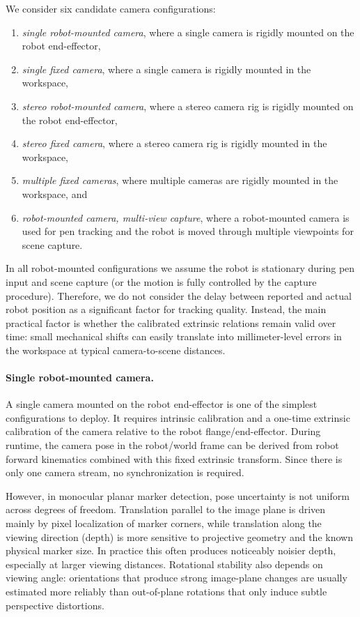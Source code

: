 We consider six candidate camera configurations:
\begin{enumerate}[label=(\roman*), itemsep=0.2em]
    \item \emph{single robot-mounted camera}, where a single camera is rigidly mounted on the robot end-effector,
    \item \emph{single fixed camera}, where a single camera is rigidly mounted in the workspace,
    \item \emph{stereo robot-mounted camera}, where a stereo camera rig is rigidly mounted on the robot end-effector,
    \item \emph{stereo fixed camera}, where a stereo camera rig is rigidly mounted in the workspace,
    \item \emph{multiple fixed cameras}, where multiple cameras are rigidly mounted in the workspace, and
    \item \emph{robot-mounted camera, multi-view capture}, where a robot-mounted camera is used for pen tracking and the robot is moved through multiple viewpoints for scene capture.
\end{enumerate}

In all robot-mounted configurations we assume the robot is stationary during pen input and scene capture (or the motion is fully controlled by the capture procedure). Therefore, we do not consider the delay between reported and actual robot position as a significant factor for tracking quality. Instead, the main practical factor is whether the calibrated extrinsic relations remain valid over time: small mechanical shifts can easily translate into millimeter-level errors in the workspace at typical camera-to-scene distances.

\paragraph{Single robot-mounted camera.}
A single camera mounted on the robot end-effector is one of the simplest configurations to deploy. It requires intrinsic calibration and a one-time extrinsic calibration of the camera relative to the robot flange/end-effector. During runtime, the camera pose in the robot/world frame can be derived from robot forward kinematics combined with this fixed extrinsic transform. Since there is only one camera stream, no synchronization is required.

However, in monocular planar marker detection, pose uncertainty is not uniform across degrees of freedom. Translation parallel to the image plane is driven mainly by pixel localization of marker corners, while translation along the viewing direction (depth) is more sensitive to projective geometry and the known physical marker size. In practice this often produces noticeably noisier depth, especially at larger viewing distances. Rotational stability also depends on viewing angle: orientations that produce strong image-plane changes are usually estimated more reliably than out-of-plane rotations that only induce subtle perspective distortions.

